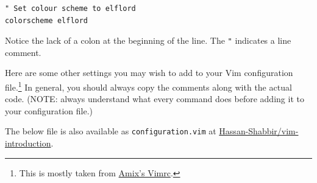 \documentclass[11pt]{article}
\begin{document}
\begin{verbatim}
" Set colour scheme to elflord 
colorscheme elflord 
\end{verbatim}

Notice the lack of a colon at the beginning of the line. The \texttt{"} indicates a
line comment.

Here are some other settings you may wish to add to your Vim configuration
file.\footnote{This is mostly taken from \href{https://github.com/amix/vimrc}{Amix's Vimrc}.} In general, you should always copy the comments along with the
actual code. (NOTE: always understand what every command does before adding it
to your configuration file.)

The below file is also available as \texttt{configuration.vim} at
\href{https://github.com/Hassan-Shabbir/vim-introduction}{Hassan-Shabbir/vim-introduction}.
\end{document}
